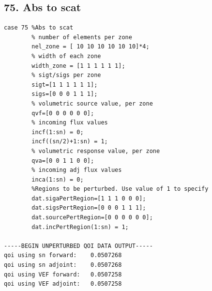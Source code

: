 \documentclass{article}
\begin{document}
\subsection{75. Abs to scat}
\begin{verbatim}
case 75 %Abs to scat
        % number of elements per zone
        nel_zone = [ 10 10 10 10 10 10]*4;
        % width of each zone
        width_zone = [1 1 1 1 1 1];
        % sigt/sigs per zone
        sigt=[1 1 1 1 1 1];
        sigs=[0 0 0 1 1 1];
        % volumetric source value, per zone
        qvf=[0 0 0 0 0 0];
        % incoming flux values
        incf(1:sn) = 0;
        incf((sn/2)+1:sn) = 1;
        % volumetric response value, per zone
        qva=[0 0 1 1 0 0];
        % incoming adj flux values
        inca(1:sn) = 0;
        %Regions to be perturbed. Use value of 1 to specify
        dat.sigaPertRegion=[1 1 1 0 0 0];
        dat.sigsPertRegion=[0 0 0 1 1 1];
        dat.sourcePertRegion=[0 0 0 0 0 0];
        dat.incPertRegion(1:sn) = 1;   
        
-----BEGIN UNPERTURBED QOI DATA OUTPUT----- 
qoi using sn forward: 	 0.0507268 
qoi using sn adjoint: 	 0.0507268 
qoi using VEF forward: 	 0.0507258 
qoi using VEF adjoint: 	 0.0507258 
\end{verbatim}
\end{document}
